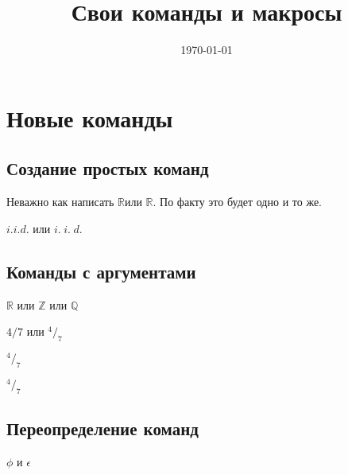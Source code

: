 \documentclass[12pt, a4paper]{article}
\title{Свои команды и макросы}
\date{\today}
\theoremstyle{plain}              %
\theoremstyle{definition}         %
\begin{document}
\maketitle


\section{Новые команды}
\subsection{Создание простых команд}


\def \a{\alpha}
\def \R{\ensuremath{\mathbb{R}}}


\newcommand{\RR}{\ensuremath{\mathbb{R}}}

Неважно как написать \R или \RR. По факту это будет одно и то же.


\newcommand{\iid}{i.\hspace{3pt}i.\hspace{3pt}d.}

$i.i.d.$ или $\iid$

\subsection{Команды с аргументами}

\newcommand{\bb}[1]{\ensuremath{\mathbb{#1}} }

\bb{R} или \bb{Z} или \bb{Q}


$4/7$ или $^4/_7$

\newcommand{\fr}[2]{\ensuremath{^#1/_#2}}

$\fr{4}{7}$

\fr{4}{7}


\subsection{Переопределение команд}

$ \phi $ и $ \epsilon $

\renewcommand{\phi}{\varphi}
\renewcommand{\epsilon}{\varepsilon}
\end{document}
